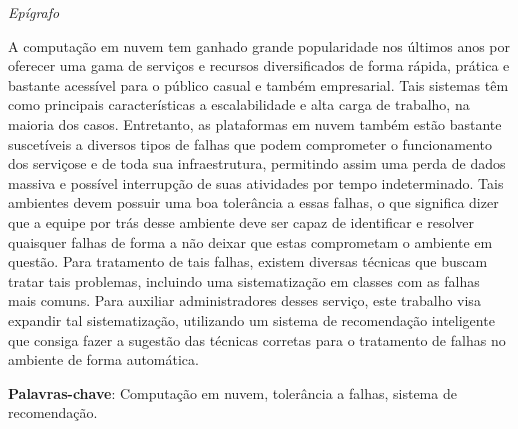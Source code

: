 \documentclass[
	12pt,				%
	a4paper,			%
	english,			%
	french,				%
	spanish,			%
	brazil				%
	]{abntex2}
\begin{document}


%
%

\begin{epigrafe}
    \vspace*{\fill}
	\begin{flushright}
		\textit{Epígrafo}
	\end{flushright}
\end{epigrafe}


\setlength{\absparsep}{18pt} %
\begin{resumo}
 A computação em nuvem tem ganhado grande popularidade nos últimos anos por oferecer uma gama de serviços e recursos diversificados de forma rápida, prática e bastante acessível para o público casual e também empresarial. Tais sistemas têm como principais características a escalabilidade e alta carga de trabalho, na maioria dos casos. Entretanto, as plataformas em nuvem também estão bastante suscetíveis a diversos tipos de falhas que podem comprometer o funcionamento dos serviçose e de toda sua infraestrutura, permitindo assim uma perda de dados massiva e possível interrupção de suas atividades por tempo indeterminado. Tais ambientes devem possuir uma boa tolerância a essas falhas, o que significa dizer que a equipe por trás desse ambiente deve ser capaz de identificar e resolver quaisquer falhas de forma a não deixar que estas comprometam o ambiente em questão. Para tratamento de tais falhas, existem diversas técnicas que buscam tratar tais problemas, incluindo uma sistematização em classes com as falhas mais comuns. Para auxiliar administradores desses serviço, este trabalho visa expandir tal sistematização, utilizando um sistema de recomendação inteligente que consiga fazer a sugestão das técnicas corretas para o tratamento de falhas no ambiente de forma automática.

 \textbf{Palavras-chave}: Computação em nuvem, tolerância a falhas, sistema de recomendação.
\end{resumo}
\end{document}
